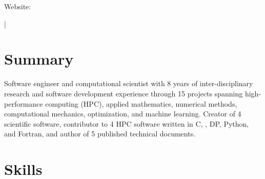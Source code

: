 \documentclass[letterpaper,10pt]{article}
\begin{document}
{\scshape\huge\Author}\vspace{2pt}

\begin{small}
  Website: \href{\AuthorWebsiteLink}{\AuthorWebsiteText}

  \vspace{2pt}\AuthorAddress

  \vspace{1pt}\href{mailto:\AuthorEmail}{\AuthorEmail} |
  \href{\AuthorPhoneLink}{\AuthorPhoneText}
\end{small}

\section{Summary}
Software engineer and computational scientist with 8 years of
inter-disciplinary research and software development experience through
15\smallplus{} projects spanning high-performance computing (HPC), applied
mathematics, numerical methods, computational mechanics, optimization, and
machine learning. Creator of 4 scientific software, contributor to 4 HPC
software written in C, \CC{}, DP\CC{}, Python, and Fortran, and author of 5
published technical documents.

\section{Skills}
  \resumeSubItemListStart
  \resumeSubItemListEnd

\vspace{-244.4pt}
\end{document}
